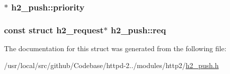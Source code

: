 \subsubsection[{\texorpdfstring{priority}{priority}}]{$\ast$ h2\+\_\+push\+::priority}\hypertarget{structh2__push_a79d7ef1a9ad462fb988ee537a0d45662}{}\label{structh2__push_a79d7ef1a9ad462fb988ee537a0d45662}
\subsubsection[{\texorpdfstring{req}{req}}]{\setlength{\rightskip}{0pt plus 5cm}const struct {\bf h2\+\_\+request}$\ast$ h2\+\_\+push\+::req}\hypertarget{structh2__push_a4541bdab05a10c6a58a413b0493c1a80}{}\label{structh2__push_a4541bdab05a10c6a58a413b0493c1a80}


The documentation for this struct was generated from the following file\+:\begin{DoxyCompactItemize}
\item 
/usr/local/src/github/\+Codebase/httpd-\/2../modules/http2/\hyperlink{h2__push_8h}{h2\+\_\+push.\+h}\end{DoxyCompactItemize}
